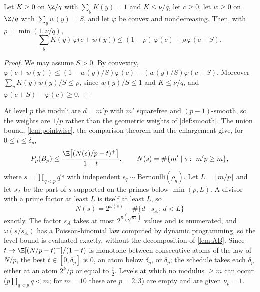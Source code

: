 \begin{lemma}\label{lem:bernoulli}
Let $K\ge0$ on $\Z/q$ with $\sum_yK(y)=1$ and $K\le\nu/q$, let $c\ge0$, let $w\ge0$ on $\Z/q$ with
$\sum_yw(y)=S$, and let $\varphi$ be convex and nondecreasing. Then, with $\rho=\min(1,\nu/q)$,
\[
  \sum_yK(y)\,\varphi\bigl(c+w(y)\bigr)\le(1-\rho)\,\varphi(c)+\rho\,\varphi(c+S).
\]
\end{lemma}

\begin{proof}
We may assume $S>0$. By convexity, $\varphi(c+w(y))\le(1-w(y)/S)\varphi(c)+(w(y)/S)\varphi(c+S)$. Moreover
$\sum_yK(y)w(y)/S\le\rho$, since $w(y)/S\le1$ and $K\le\nu/q$, and $\varphi(c+S)-\varphi(c)\ge0$.
\end{proof}

At level $p$ the moduli are $d=m'p$ with $m'$ squarefree and $(p-1)$-smooth, so the weights are $1/p$ rather than
the geometric weights of \cref{def:smooth}. The union bound, \cref{lem:pointwise}, the comparison theorem and the
enlargement give, for $0\le t\le\delta_p$,
\[
  P_p(B_p)\le\frac{\E\bigl[(N(s)/p-t)^+\bigr]}{1-t},\qquad N(s)=\#\{m'\mid s:\ m'p\ge m\},
\]
where $s=\prod_{q<p}q^{\epsilon_q}$ with independent $\epsilon_q\sim\mathrm{Bernoulli}(\rho_q)$. Let $L=\lceil m/p\rceil$
and let $s_A$ be the part of $s$ supported on the primes below $\min(p,L)$. A divisor with a prime factor at least $L$
is itself at least $L$, so
\[
  N(s)=2^{\omega(s)}-\#\{d\mid s_A:\ d<L\}
\]
exactly. The factor $s_A$ takes at most $2^{\pi(\sqrt m)}$ values and is enumerated, and $\omega(s/s_A)$ has a
Poisson-binomial law computed by dynamic programming, so the level bound is evaluated exactly, without the
decomposition of \cref{lem:AB}. Since $t\mapsto\E[(N/p-t)^+]/(1-t)$ is monotone between consecutive atoms of the law
of $N/p$, the best $t\in[0,\delta_p]$ is $0$, an atom below $\delta_p$, or $\delta_p$; the schedule takes each
$\delta_p$ either at an atom $2^k/p$ or equal to $\frac12$. Levels at which no modulus $\ge m$ can occur ($p\prod_{q<p}q<m$; for $m=10$ these are $p=2,3$)
are empty and are given $\nu_p=1$.

